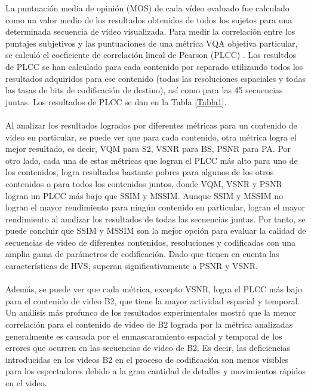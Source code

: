 \documentclass[conference]{IEEEtran}
\begin{document}
    La puntuación media de opinión (MOS) de cada vídeo evaluado fue 
    calculado como un valor medio de los resultados obtenidos de todos 
    los sujetos para una determinada secuencia de vídeo visualizada. 
    Para medir la correlación entre los puntajes subjetivos y las 
    puntuaciones de una métrica VQA objetiva particular, se calculó el 
    coeficiente de correlación lineal de Pearson (PLCC) \cite{biblio24}. Los 
    resultdos de PLCC se han calculado para cada contenido por 
    separado utilizando todos los resultados adquiridos para ese 
    contenido (todas las resoluciones espaciales y todas las tasas de bits 
    de codificación de destino), así como para las 45 secuencias juntas. 
    Los resultados de PLCC se dan en la Tabla \ref{Tabla1}.\\
    \\
    Al analizar los resultados logrados por diferentes métricas para un 
    contenido de video en particular, se puede ver que para cada 
    contenido, otra métrica logra el mejor resultado, es decir, VQM para 
    S2, VSNR para BS, PSNR para PA. Por otro lado, cada una de estas 
    métricas que logran el PLCC más alto para uno de los contenidos, 
    logra resultados bastante pobres para algunos de los otros 
    contenidos o para todos los contenidos juntos, donde VQM, VSNR y 
    PSNR logran un PLCC más bajo que SSIM y MSSIM. Aunque SSIM y 
    MSSIM no logran el mayor rendimiento para ningún contenido en 
    particular, logran el mayor rendimiento al analizar los resultados de 
    todas las secuencias juntas. Por tanto, se puede concluir que SSIM 
    y MSSIM son la mejor opción para evaluar la calidad de secuencias de 
    video de diferentes contenidos, resoluciones y codificadas con una 
    amplia gama de parámetros de codificación. Dado que tienen en 
    cuenta las características de HVS, superan significativamente a PSNR 
    y VSNR.\\
    \\
    Además, se puede ver que cada métrica, excepto VSNR, logra el PLCC 
    más bajo para el contenido de video B2, que tiene la mayor actividad 
    espacial y temporal. Un análisis más profunco de los resultados 
    experimentales mostró que la menor correlación para el contenido de 
    video de B2 lograda por la métrica analizadas generalmente es 
    causada por el enmascaramiento espacial y temporal de los errores 
    que ocurren en las secuencias de video de B2. Es decir, las 
    deficiencias introducidas en los videos B2 en el proceso de 
    codificación son menos visibles para los espectadores debido a la 
    gran cantidad de detalles y movimientos rápidos en el video.\\
    
\end{document}
